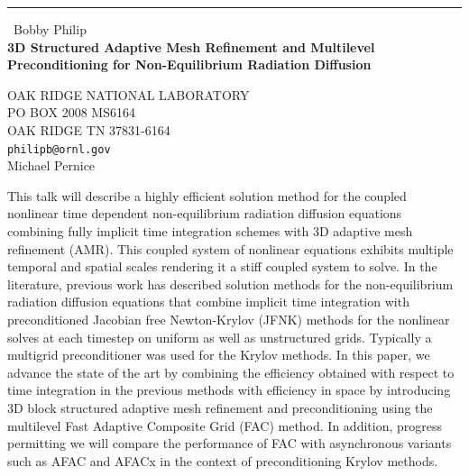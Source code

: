 \documentclass{report}
\begin{document}
\begin{center}
\rule{6in}{1pt} \
{\large Bobby Philip \\
{\bf 3D Structured Adaptive Mesh Refinement and Multilevel Preconditioning for Non-Equilibrium Radiation Diffusion}}

OAK RIDGE NATIONAL LABORATORY \\ PO BOX 2008 MS6164 \\ OAK RIDGE TN 37831-6164
\\
{\tt philipb@ornl.gov}\\
Michael Pernice\end{center}

This talk will describe a highly efficient solution method for the
coupled nonlinear time dependent non-equilibrium radiation diffusion
equations combining fully implicit time integration schemes with 3D
adaptive mesh refinement (AMR). This coupled system of nonlinear
equations exhibits multiple temporal and spatial scales rendering it a
stiff coupled system to solve. In the literature, previous work has
described solution methods for the non-equilibrium radiation diffusion
equations that combine implicit time integration with preconditioned
Jacobian free Newton-Krylov (JFNK) methods for the nonlinear solves at
each timestep on uniform as well as unstructured grids. Typically a
multigrid preconditioner was used for the Krylov methods. In this paper,
we advance the state of the art by combining the efficiency obtained with
respect to time integration in the previous methods with efficiency in
space by introducing 3D block structured adaptive mesh refinement and
preconditioning using the multilevel Fast Adaptive Composite Grid (FAC)
method. In addition, progress permitting we will compare the performance
of FAC with asynchronous variants such as AFAC and AFACx in the context
of preconditioning Krylov methods.
\end{document}
